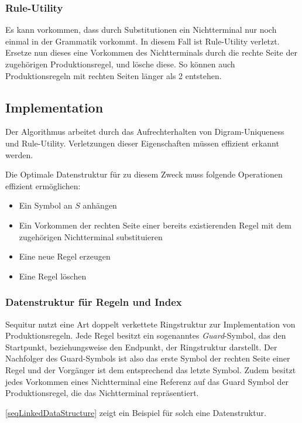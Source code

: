 \subsubsection{Rule-Utility}

Es kann vorkommen, dass durch Substitutionen ein Nichtterminal nur noch einmal in der Grammatik vorkommt. In diesem Fall ist Rule-Utility verletzt. Ersetze nun dieses eine Vorkommen des Nichtterminals durch die rechte Seite der zugehörigen Produktionsregel, und lösche diese. So können auch Produktionsregeln mit rechten Seiten länger als 2 entstehen.

\subsection{Implementation}

Der Algorithmus arbeitet durch das Aufrechterhalten von Digram-Uniqueness und Rule-Utility. Verletzungen dieser Eigenschaften müssen effizient erkannt werden.

Die Optimale Datenstruktur für zu diesem Zweck muss folgende Operationen effizient ermöglichen:

\begin{itemize}
	\item Ein Symbol an $S$ anhängen
	\item Ein Vorkommen der rechten Seite einer bereits existierenden Regel mit dem zugehörigen Nichtterminal substituieren
	\item Eine neue Regel erzeugen
	\item Eine Regel löschen
\end{itemize}

\subsubsection{Datenstruktur für Regeln und Index}

Sequitur nutzt eine Art doppelt verkettete Ringstruktur zur Implementation von Produktionsregeln. 
Jede Regel besitzt ein sogenanntes \emph{Guard}-Symbol, das den Startpunkt, beziehungsweise den Endpunkt, der Ringstruktur darstellt. Der Nachfolger des Guard-Symbols ist also das erste Symbol der rechten Seite einer Regel und der Vorgänger ist dem entsprechend das letzte Symbol.
Zudem besitzt jedes Vorkommen eines Nichtterminal eine Referenz auf das Guard Symbol der Produktionsregel, die das Nichtterminal repräsentiert. 

\autoref{seqLinkedDataStructure} zeigt ein Beispiel für solch eine Datenstruktur.


